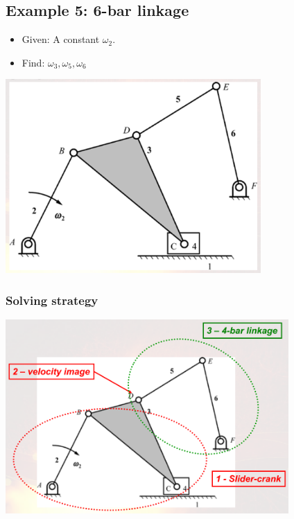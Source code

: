 \documentclass[11pt]{article}
\begin{document}
 \newpage
\subsection{Example 5: 6-bar linkage}
\label{sec:org391eb6c}
\begin{itemize}
\item Given: A constant \(\omega_2\).
\item Find: \(\omega_3, \omega_5, \omega_6\)
\end{itemize}

\begin{center}
\includegraphics[height=20em]{./images/6-bar-linkage-graphical-analysis-example.png}
\end{center}
\subsubsection{Solving strategy}
\label{sec:org87a052d}
\begin{center}
\includegraphics[height=20em]{./images/6-bar-linkage-graphical-analysis-example-solving-strategy.png}
\end{center}
 \newpage
\end{document}
